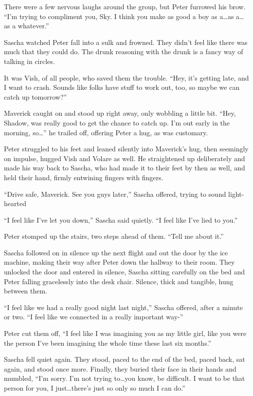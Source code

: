 There were a few nervous laughs around the group, but Peter furrowed his brow. ``I'm trying to compliment you, Sky. I think you make as good a boy as a\ldots{}as a\ldots{}as a whatever.''

Sascha watched Peter fall into a sulk and frowned. They didn't feel like there was much that they could do. The drunk reasoning with the drunk is a fancy way of talking in circles.

It was Vish, of all people, who saved them the trouble. ``Hey, it's getting late, and I want to crash. Sounds like folks have stuff to work out, too, so maybe we can catch up tomorrow?''

Maverick caught on and stood up right away, only wobbling a little bit. ``Hey, Shadow, was really good to get the chance to catch up. I'm out early in the morning, so\ldots{}'' he trailed off, offering Peter a hug, as was customary.

Peter struggled to his feet and leaned silently into Maverick's hug, then seemingly on impulse, hugged Vish and Volare as well. He straightened up deliberately and made his way back to Sascha, who had made it to their feet by then as well, and held their hand, firmly entwining fingers with fingers.

``Drive safe, Maverick. See you guys later,'' Sascha offered, trying to sound light-hearted

\secdiv{}

``I feel like I've let you down,'' Sascha said quietly. ``I feel like I've lied to you.''

Peter stomped up the stairs, two steps ahead of them. ``Tell me about it.''

Sascha followed on in silence up the next flight and out the door by the ice machine, making their way after Peter down the hallway to their room. They unlocked the door and entered in silence, Sascha sitting carefully on the bed and Peter falling gracelessly into the desk chair. Silence, thick and tangible, hung between them.

``I feel like we had a really good night last night,'' Sascha offered, after a minute or two. ``I feel like we connected in a really important way-''

Peter cut them off, ``I feel like I was imagining you as my little girl, like you were the person I've been imagining the whole time these last six months.''

Sascha fell quiet again. They stood, paced to the end of the bed, paced back, sat again, and stood once more. Finally, they buried their face in their hands and mumbled, ``I'm sorry. I'm not trying to\ldots{}you know, be difficult. I want to be that person for you, I just\ldots{}there's just so only so much I can do.''

